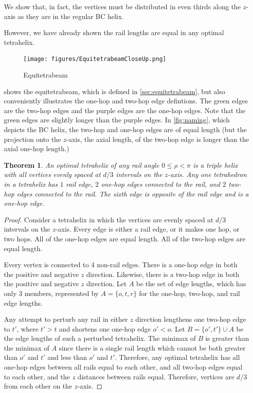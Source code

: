 \documentclass[twocolumn,10pt]{asme2ej}
\newtheorem{theorem}{Theorem}
\begin{document}
 We show that, in fact, the vertices must be distributed in even thirds
 along the $z$-axis as they are in the regular BC helix.

 However, we have already shown the rail
 lengths are equal in any optimal tetrahelix.

\begin{figure}
     \centering
     \texttt{[image: figures/EquitetrabeamCloseUp.png]}
     \caption{Equitetrabeam}
  \label{fig:equitetrabeam}
\end{figure}

 shows the equitetrabeam, which is defined in \cref{sec:equitetrabeam},
but also conveniently illustrates the one-hop and two-hop edge defintions.
The green edges are the two-hop edges and the purple edges are the one-hop edges. Note that the green
edges are slightly longer than the purple edges. In \cref{fig:naming}, which depicts the BC helix,
the two-hop and one-hop edges are of equal length (but the projection onto the $z$-axis, the
axial length, of the two-hop edge is longer than the axial one-hop length.)


\begin{theorem}
  \label{thm:eventhirds}
  An optimal tetrahelix of any rail angle $0 \leq \rho < \pi$ is a triple helix with all vertices evenly spaced at $d/3$ intervals on the $z$-axis.
  Any one tetrahedron in a tetrahelix has $1$ rail edge, $2$ one-hop edges connected to the rail, and $2$ two-hop edges connected to the rail.
  The sixth edge is opposite of the rail edge and is a one-hop edge.
\end{theorem}

\begin{proof}
    Consider a tetrahelix in which the vertices are evenly spaced at
    $d/3$ intervals on the $z$-axis. Every edge is either a rail edge,
    or it makes one hop, or two hops. All of the one-hop
    edges are equal length.  All of the two-hop edges are equal
    length.

    Every vertex is connected to 4 non-rail edges. There is a one-hop edge
    in both the positive and negative $z$ direction. Likewise, there is a two-hop
    edge in both the positive and negative $z$ direction. Let $A$ be the set
    of edge lengths, which has only 3 members, represented by $A = \{o,t,r\}$ for
    the one-hop, two-hop, and rail edge lengths.

    Any attempt to perturb any rail in either $z$ direction lengthens one two-hop edge to $t'$, where $t' > t$
    and shortens one one-hop edge $o' < o$. Let $B = \{o',t' \} \cup A$ be the edge lengths of such a
    perturbed tetrahelix.
    The minimax of $B$ is greater than the minimax of $A$ since there is a single rail length which cannot be both greater
    than $o'$ and $t'$ and less than $o'$ and $t'$.
    Therefore, any optimal tetrahelix has all one-hop edges between all rails equal to each other, and
    all two-hop edges equal to each other, and the $z$ distances between rails equal. Therefore, vertices are
    $d/3$ from each other on the $z$-axis.
\end{proof}
\end{document}
